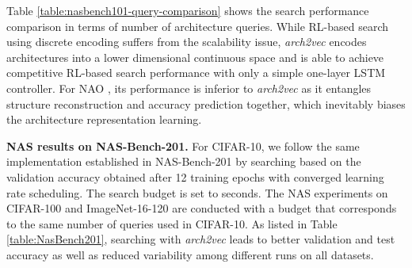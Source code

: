 Table \ref{table:nasbench101-query-comparison} shows the search performance comparison in terms of number of architecture queries. While RL-based search using discrete encoding suffers from the scalability issue, \textit{arch2vec} encodes architectures into a lower dimensional continuous space and is able to achieve competitive RL-based search performance with only a simple one-layer LSTM controller. For NAO \cite{NAO}, its performance is inferior to \textit{arch2vec} as it entangles structure reconstruction and accuracy prediction together, which inevitably biases the architecture representation learning.


\vspace{1mm}
\textbf{NAS results on NAS-Bench-201.}
For CIFAR-10, we follow the same implementation established in NAS-Bench-201 by searching based on the validation accuracy obtained after 12 training epochs with converged learning rate scheduling. The search budget is set to  seconds. The NAS experiments on CIFAR-100 and ImageNet-16-120 are conducted with a budget that corresponds to the same number of queries used in CIFAR-10. 
As listed in Table \ref{table:NasBench201}, searching with \textit{arch2vec} leads to better validation and test accuracy as well as reduced variability among different runs on all datasets.

